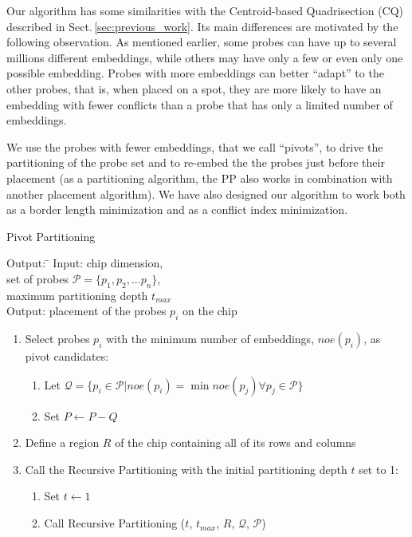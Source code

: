 \documentclass[runningheads]{llncs}
\begin{document}
Our algorithm
has some similarities with the Centroid-based Quadrisection (CQ) described
in Sect.\,\ref{sec:previous_work}.
Its main differences are motivated by the following observation.
As mentioned earlier, some probes can have up to several millions different
embeddings, while others may have only a few or even only one possible embedding.
Probes with more embeddings can better
``adapt'' to the other probes, that is, when placed on a spot, they are more likely
to have an embedding with fewer conflicts than a probe that has
only a limited number of embeddings.

We use the probes with fewer embeddings, that we call ``pivots'', to drive the
partitioning of the probe set and to re-embed the the probes just before their
placement (as a partitioning algorithm, the PP also works in combination with
another placement algorithm).
We have also designed our algorithm to work both as a border length minimization
and as a conflict index minimization.

\begin{algorithm}
\caption{Pivot Partitioning}
\label{alg:pivotpart}
\begin{minipage}{4.8in}

\begin{tabbing}
Output: \=									\kill
Input:  \> chip dimension,							\\
        \> set of probes $\mathcal{P} = \{p_{1}, p_{2}, ... p_{n}\}$, 		\\
        \> maximum partitioning depth $t_{max}$					\\
Output: \> placement of the probes $p_i$ on the chip
\end{tabbing}

\begin{enumerate}
\item Select probes $p_i$ with the minimum number of embeddings, $noe(p_i)$,
as pivot candidates:
  \begin{enumerate}
  \item Let $\mathcal{Q} = \{p_i \in \mathcal{P} | noe(p_i) = \min noe(p_j) \forall p_j \in \mathcal{P} \}$
  \item Set $P \leftarrow P - Q$
  \end{enumerate}
\item Define a region $R$ of the chip containing all of its rows and columns
\item Call the Recursive Partitioning with the initial partitioning depth $t$ set to 1:
  \begin{enumerate}
  \item Set $t \leftarrow 1$
  \item Call Recursive Partitioning ($t$, $t_{max}$, $R$, $\mathcal{Q}$, $\mathcal{P}$)
  \end{enumerate}
\end{enumerate}

\end{minipage}
\end{algorithm}
\end{document}
